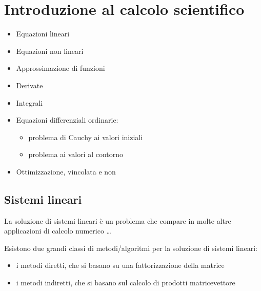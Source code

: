 \documentclass[letterpaper,10pt,english]{jupyterBook}
\begin{document}
\chapter{Introduzione al calcolo scientifico}
\label{\detokenize{ch/numerics:introduzione-al-calcolo-scientifico}}\label{\detokenize{ch/numerics:book-numerics-hs}}\label{\detokenize{ch/numerics::doc}}\begin{itemize}
\item {} 
\sphinxAtStartPar
Equazioni lineari

\item {} 
\sphinxAtStartPar
Equazioni non lineari

\item {} 
\sphinxAtStartPar
Approssimazione di funzioni

\item {} 
\sphinxAtStartPar
Derivate

\item {} 
\sphinxAtStartPar
Integrali

\item {} 
\sphinxAtStartPar
Equazioni differenziali ordinarie:
\begin{itemize}
\item {} 
\sphinxAtStartPar
problema di Cauchy ai valori iniziali

\item {} 
\sphinxAtStartPar
problema ai valori al contorno

\end{itemize}

\item {} 
\sphinxAtStartPar
Ottimizzazione, vincolata e non

\end{itemize}

\sphinxstepscope


\section{Sistemi lineari}
\label{\detokenize{ch/numerics/linear:sistemi-lineari}}\label{\detokenize{ch/numerics/linear::doc}}
\sphinxAtStartPar
La soluzione di sistemi lineari è un problema che compare in molte altre applicazioni di calcolo numerico …

\sphinxAtStartPar
Esistono due grandi classi di metodi/algoritmi per la soluzione di sistemi lineari:
\begin{itemize}
\item {} 
\sphinxAtStartPar
i metodi diretti, che si basano su una fattorizzazione della matrice

\item {} 
\sphinxAtStartPar
i metodi indiretti, che si basano sul calcolo di prodotti matrice\sphinxhyphen{}vettore

\end{itemize}
\end{document}
